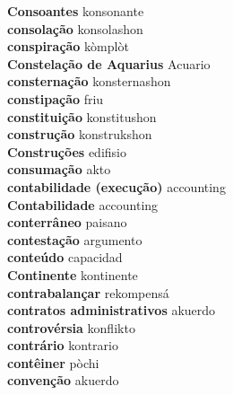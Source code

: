 \textbf{ Consoantes  } konsonante \\
\textbf{ consolação  } konsolashon \\
\textbf{ conspiração  } kòmplòt \\
\textbf{ Constelação de Aquarius  } Acuario \\
\textbf{ consternação  } konsternashon \\
\textbf{ constipação  } friu \\
\textbf{ constituição  } konstitushon \\
\textbf{ construção  } konstrukshon \\
\textbf{ Construções  } edifisio \\
\textbf{ consumação  } akto \\
\textbf{ contabilidade (execução)  } accounting \\
\textbf{ Contabilidade  } accounting \\
\textbf{ conterrâneo  } paisano \\
\textbf{ contestação  } argumento \\
\textbf{ conteúdo  } capacidad \\
\textbf{ Continente  } kontinente \\
\textbf{ contrabalançar  } rekompensá \\
\textbf{ contratos administrativos  } akuerdo \\
\textbf{ controvérsia  } konflikto \\
\textbf{ contrário  } kontrario \\
\textbf{ contêiner  } pòchi \\
\textbf{ convenção  } akuerdo \\
